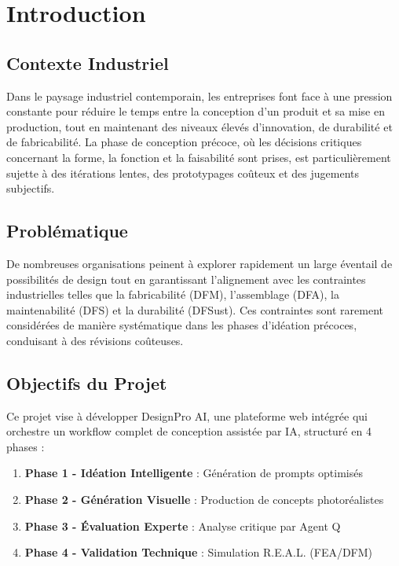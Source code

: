 \documentclass[12pt,a4paper]{article}
\begin{document}
\newpage
\tableofcontents
\newpage

\section{Introduction}

\subsection{Contexte Industriel}

Dans le paysage industriel contemporain, les entreprises font face à une pression constante pour réduire le temps entre la conception d'un produit et sa mise en production, tout en maintenant des niveaux élevés d'innovation, de durabilité et de fabricabilité. La phase de conception précoce, où les décisions critiques concernant la forme, la fonction et la faisabilité sont prises, est particulièrement sujette à des itérations lentes, des prototypages coûteux et des jugements subjectifs.

\subsection{Problématique}

De nombreuses organisations peinent à explorer rapidement un large éventail de possibilités de design tout en garantissant l'alignement avec les contraintes industrielles telles que la fabricabilité (DFM), l'assemblage (DFA), la maintenabilité (DFS) et la durabilité (DFSust). Ces contraintes sont rarement considérées de manière systématique dans les phases d'idéation précoces, conduisant à des révisions coûteuses.

\subsection{Objectifs du Projet}

Ce projet vise à développer DesignPro AI, une plateforme web intégrée qui orchestre un workflow complet de conception assistée par IA, structuré en 4 phases :

\begin{enumerate}
    \item \textbf{Phase 1 - Idéation Intelligente} : Génération de prompts optimisés
    \item \textbf{Phase 2 - Génération Visuelle} : Production de concepts photoréalistes
    \item \textbf{Phase 3 - Évaluation Experte} : Analyse critique par Agent Q
    \item \textbf{Phase 4 - Validation Technique} : Simulation R.E.A.L. (FEA/DFM)
\end{enumerate}
\end{document}

